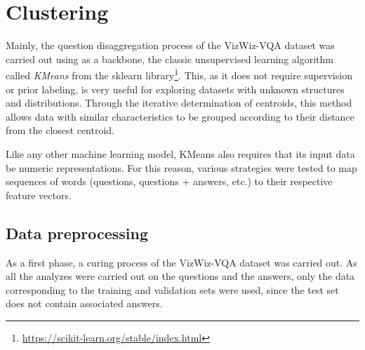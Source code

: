 \section{Clustering}

Mainly, the question disaggregation process of the VizWiz-VQA dataset was carried out using as a backbone, the classic unsupervised learning algorithm called \emph{KMeans} from the sklearn library\footnote{\url{https://scikit-learn.org/stable/index.html}}. This, as it does not require supervision or prior labeling, is very useful for exploring datasets with unknown structures and distributions. Through the iterative determination of centroids, this method allows data with similar characteristics to be grouped according to their distance from the closest centroid.

Like any other machine learning model, KMeans also requires that its input data be numeric representations. For this reason, various strategies were tested to map sequences of words (questions, questions + answers, etc.) to their respective feature vectors.

\subsection{Data preprocessing}
As a first phase, a curing process of the VizWiz-VQA dataset was carried out. As all the analyzes were carried out on the questions and the answers, only the data corresponding to the training and validation sets were used, since the test set does not contain associated answers.

